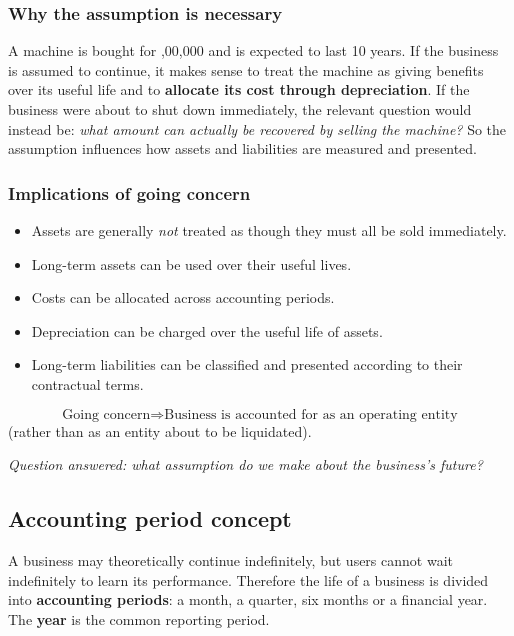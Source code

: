\documentclass[11pt,a4paper]{article}
\newcommand{\Rs}{\ifmmode\text{\rsfont ₹}\else{\rsfont ₹}\fi}
\begin{document}
\subsubsection{Why the assumption is necessary}

A machine is bought for \Rs 10,00,000 and is expected to last 10 years. If the business is assumed to continue, it
makes sense to treat the machine as giving benefits over its useful life and to \textbf{allocate its cost through
depreciation}. If the business were about to shut down immediately, the relevant question would instead be: \emph{what
amount can actually be recovered by selling the machine?} So the assumption influences how assets and liabilities are
measured and presented.

\subsubsection{Implications of going concern}

\begin{itemize}
  \item Assets are generally \emph{not} treated as though they must all be sold immediately.
  \item Long-term assets can be used over their useful lives.
  \item Costs can be allocated across accounting periods.
  \item Depreciation can be charged over the useful life of assets.
  \item Long-term liabilities can be classified and presented according to their contractual terms.
\end{itemize}

\[
\boxed{\text{Going concern}\Rightarrow\text{Business is accounted for as an operating entity}}
\]
(rather than as an entity about to be liquidated).

\begin{keybox}
\emph{Question answered: what assumption do we make about the business's future?}
\end{keybox}

\subsection{Accounting period concept}

A business may theoretically continue indefinitely, but users cannot wait indefinitely to learn its performance.
Therefore the life of a business is divided into \textbf{accounting periods}: a month, a quarter, six months or a
financial year. The \textbf{year} is the common reporting period.
\end{document}
